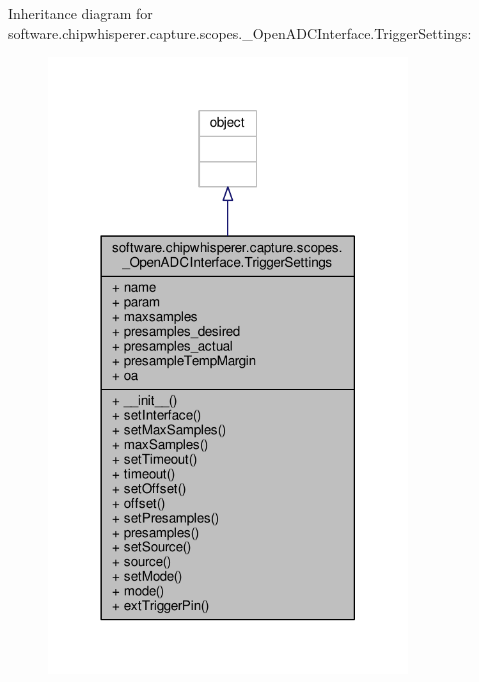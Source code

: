 Inheritance diagram for software.\+chipwhisperer.\+capture.\+scopes.\+\_\+\+Open\+A\+D\+C\+Interface.\+Trigger\+Settings\+:\nopagebreak
\begin{figure}[H]
\begin{center}
\leavevmode
\includegraphics[width=270pt]{d4/d37/classsoftware_1_1chipwhisperer_1_1capture_1_1scopes_1_1__OpenADCInterface_1_1TriggerSettings__inherit__graph}
\end{center}
\end{figure}



